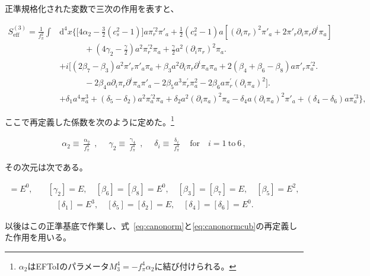\documentclass[a4paper,11pt]{ltjsarticle}
\numberwithin{equation}{section}
\def\pia{\pi_{a}}
\def\pir{\pi_{r}}
\newcommand{\dd}{\mathrm{d}}
\newcommand{\Eqs}[1]{Eqs.~(\ref{#1})}
\renewcommand{\Eqs}[1]{式~\eqref{#1}}
\begin{document}
正準規格化された変数で三次の作用を表すと、

\begin{align}\label{eq:canonormcub}
S_{\mathrm{eff}}^{(3)} =   \frac{1}{f_\pi^2} \int & \dd^4 x \Big\{\Big[4 \alpha_2 -  \frac{3}{2} (c^2_s-1) \Big]  a \pir^{\prime2} \pi'_{a} +\frac{1}{2} (c^2_s-1) a \left[\left(\partial_i \pir \right)^2 \pi'_a + 2 \pi'_{r}	\partial_i \pir  \partial^i \pia \right] \\
& \qquad \quad + \left(4 \gamma_2 - \frac{\gamma}{2}\right)  a^2\pir^{\prime2} \pia	+ \frac{\gamma}{2} a^2	\left(\partial_i \pir \right)^2 \pia \nonumber \Big. \\
&+ i \Big[\left(2\beta_7-\beta_3\right) a^2 \pi'_{r} \pi'_{a} \pia + \beta_3 a^2 \partial_i \pir  \partial^i \pia \pia + 2(\beta_4+ \beta_6 - \beta_8) a \pi'_{r} \pia^{\prime2} \Big. \nonumber \\
& \qquad \quad - 2 \beta_4  a \partial_i \pir  \partial^i \pia \pi'_{a} - 2\beta_5 a^3 \pir^{\prime} \pia^2  - 2 \beta_6 a \pir^{\prime} (\partial_i\pia)^2 \Big]  \Big. \nonumber\\
&+\delta_1 a^4 \pia^3 + (\delta_5- \delta_2) a^2 \pia^{\prime2} \pia  + \delta_2 a^2 (\partial_i \pia)^2 \pia - \delta_4 a  (\partial_i \pia)^2 \pi'_a + (\delta_4-\delta_6) a \pia^{\prime3} \Big\},  \nonumber
\end{align}

ここで再定義した係数を次のように定めた。\footnote{$\alpha_2$はEFToI\cite{Cheung:2007st}のパラメータ$M_3^4=-f_\pi^4\alpha_2$に結び付けられる。}

\begin{align}
\alpha_2 \equiv \frac{\upalpha_2}{f_\pi^4}\;,\quad\; \gamma_2 \equiv \frac{\upgamma_{4}}{f_\pi^4} \;,\quad\; \delta_i \equiv \frac{\updelta_{i}}{f_\pi^4} \quad\mathrm{for}\quad i = 1 ~\mathrm{to}~6\,,
\end{align}

その次元は次である。

\begin{align}
[\alpha_2] = E^{0}, &\quad [\gamma_2] = E, \quad [\beta_6] =  [\beta_8] = E^0, \quad [\beta_3] = [\beta_7] = E, \quad [\beta_5] = E^2, \nonumber \\
& \qquad  [\delta_1] = E^3, \quad [\delta_5] = [\delta_2] = E, \quad [\delta_4] = [\delta_6] = E^0  . 
\end{align}

以後はこの正準基底で作業し、\Eqs{eq:canonorm}と\eqref{eq:canonormcub}の再定義した作用を用いる。
\end{document}
